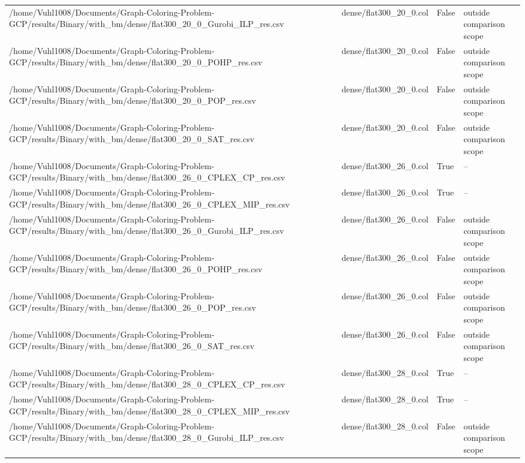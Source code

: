 \begin{table}[htbp]
\begin{tabular}{llll}
/home/Vuhl1008/Documents/Graph-Coloring-Problem-GCP/results/Binary/with\_bm/dense/flat300\_20\_0\_Gurobi\_ILP\_res.csv & dense/flat300\_20\_0.col & False & outside comparison scope \\
/home/Vuhl1008/Documents/Graph-Coloring-Problem-GCP/results/Binary/with\_bm/dense/flat300\_20\_0\_POHP\_res.csv & dense/flat300\_20\_0.col & False & outside comparison scope \\
/home/Vuhl1008/Documents/Graph-Coloring-Problem-GCP/results/Binary/with\_bm/dense/flat300\_20\_0\_POP\_res.csv & dense/flat300\_20\_0.col & False & outside comparison scope \\
/home/Vuhl1008/Documents/Graph-Coloring-Problem-GCP/results/Binary/with\_bm/dense/flat300\_20\_0\_SAT\_res.csv & dense/flat300\_20\_0.col & False & outside comparison scope \\
/home/Vuhl1008/Documents/Graph-Coloring-Problem-GCP/results/Binary/with\_bm/dense/flat300\_26\_0\_CPLEX\_CP\_res.csv & dense/flat300\_26\_0.col & True & -- \\
/home/Vuhl1008/Documents/Graph-Coloring-Problem-GCP/results/Binary/with\_bm/dense/flat300\_26\_0\_CPLEX\_MIP\_res.csv & dense/flat300\_26\_0.col & True & -- \\
/home/Vuhl1008/Documents/Graph-Coloring-Problem-GCP/results/Binary/with\_bm/dense/flat300\_26\_0\_Gurobi\_ILP\_res.csv & dense/flat300\_26\_0.col & False & outside comparison scope \\
/home/Vuhl1008/Documents/Graph-Coloring-Problem-GCP/results/Binary/with\_bm/dense/flat300\_26\_0\_POHP\_res.csv & dense/flat300\_26\_0.col & False & outside comparison scope \\
/home/Vuhl1008/Documents/Graph-Coloring-Problem-GCP/results/Binary/with\_bm/dense/flat300\_26\_0\_POP\_res.csv & dense/flat300\_26\_0.col & False & outside comparison scope \\
/home/Vuhl1008/Documents/Graph-Coloring-Problem-GCP/results/Binary/with\_bm/dense/flat300\_26\_0\_SAT\_res.csv & dense/flat300\_26\_0.col & False & outside comparison scope \\
/home/Vuhl1008/Documents/Graph-Coloring-Problem-GCP/results/Binary/with\_bm/dense/flat300\_28\_0\_CPLEX\_CP\_res.csv & dense/flat300\_28\_0.col & True & -- \\
/home/Vuhl1008/Documents/Graph-Coloring-Problem-GCP/results/Binary/with\_bm/dense/flat300\_28\_0\_CPLEX\_MIP\_res.csv & dense/flat300\_28\_0.col & True & -- \\
/home/Vuhl1008/Documents/Graph-Coloring-Problem-GCP/results/Binary/with\_bm/dense/flat300\_28\_0\_Gurobi\_ILP\_res.csv & dense/flat300\_28\_0.col & False & outside comparison scope \\

\end{tabular}
\end{table}
